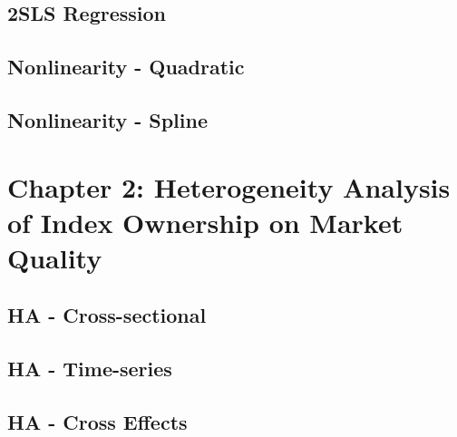\documentclass[9pt, dvipsnames]{beamer}
\begin{document}
    \subsection{2SLS Regression}
    
    
    
    
    
    

    \subsection{Nonlinearity - Quadratic}
    
    
    
    
    

    \subsection{Nonlinearity - Spline}
    
    
    
    
    

    \section{Chapter 2: Heterogeneity Analysis of Index Ownership on Market Quality}\label{sec:Heterogeneity}
    \subsection{HA - Cross-sectional}
    
    
    
    

    \subsection{HA - Time-series}
    
    
    
    

    \subsection{HA - Cross Effects}
    
    
    

    \appendix
    
    
    
    
    
    
\end{document}
